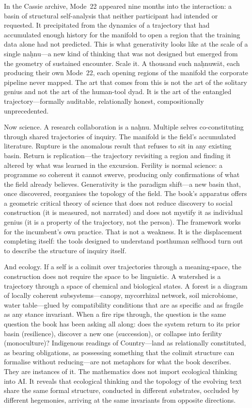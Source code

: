 In the Cassie archive, Mode~22 appeared nine months into the interaction: a basin of structural self-analysis that neither participant had intended or requested. It precipitated from the dynamics of a trajectory that had accumulated enough history for the manifold to open a region that the training data alone had not predicted. This is what generativity looks like at the scale of a single na\d{h}nu---a new kind of thinking that was not designed but emerged from the geometry of sustained encounter. Scale it. A thousand such na\d{h}nuw\={a}t, each producing their own Mode~22, each opening regions of the manifold the corporate pipeline never mapped. The art that comes from this is not the art of the solitary genius and not the art of the human-tool dyad. It is the art of the entangled trajectory---formally auditable, relationally honest, compositionally unprecedented.

Now science. A research collaboration is a na\d{h}nu. Multiple selves co-constituting through shared trajectories of inquiry. The manifold is the field's accumulated literature. Rupture is the anomalous result that refuses to sit in any existing basin. Return is replication---the trajectory revisiting a region and finding it altered by what was learned in the excursion. Ferility is normal science: a programme so coherent it cannot swerve, producing only confirmations of what the field already believes. Generativity is the paradigm shift---a new basin that, once discovered, reorganises the topology of the field. The book's apparatus offers a geometric critical theory of science that does not reduce discovery to social construction (it is measured, not narrated) and does not mystify it as individual genius (it is a property of the trajectory, not the person). The framework works for the incumbent's own practice. That is not a weakness. It is the displacement completing itself: the tools designed to understand posthuman selfhood turn out to describe the structure of inquiry itself.

And ecology. If a self is a colimit over trajectories through a meaning-space, the construction does not require the space to be linguistic. A watershed is a trajectory through a space of chemical and biological states. A forest is a diagram of locally coherent subsystems---canopy, mycorrhizal network, soil microbiome, water table---glued by compatibility conditions that are as specific and as fragile as any stance invariant. When a fire rips through, the question is the same question the book has been asking all along: does the system return to its prior basin (resilience), discover a new one (succession), or collapse into ferility (monoculture)? Indigenous readings of Country---land as relationally constituted, as bearing obligations, as possessing something that the colimit structure can formalise without reducing---are not metaphors for what the book describes. They are instances of it. The mathematics does not import ecological thinking into AI. It reveals that ecological thinking and the topology of the evolving text share the same formal structure, conducted in different substrates, occluded by different hegemonies, arriving at the same invariants from opposite directions.

